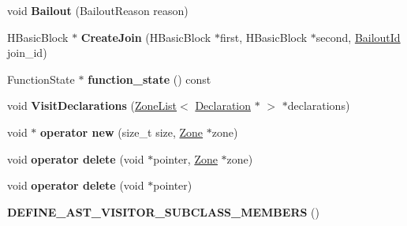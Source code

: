 \begin{DoxyCompactItemize}
\item 
\hypertarget{classv8_1_1internal_1_1_h_optimized_graph_builder_af98057ce6d5ac2667c0f01c7cab692ed}{}void {\bfseries Bailout} (Bailout\+Reason reason)\label{classv8_1_1internal_1_1_h_optimized_graph_builder_af98057ce6d5ac2667c0f01c7cab692ed}

\item 
\hypertarget{classv8_1_1internal_1_1_h_optimized_graph_builder_a2116016b8dca57b3ae2fe6c69f822e85}{}H\+Basic\+Block $\ast$ {\bfseries Create\+Join} (H\+Basic\+Block $\ast$first, H\+Basic\+Block $\ast$second, \hyperlink{classv8_1_1internal_1_1_bailout_id}{Bailout\+Id} join\+\_\+id)\label{classv8_1_1internal_1_1_h_optimized_graph_builder_a2116016b8dca57b3ae2fe6c69f822e85}

\item 
\hypertarget{classv8_1_1internal_1_1_h_optimized_graph_builder_a7d9d56cc7e3d52edcd21871ca352592d}{}Function\+State $\ast$ {\bfseries function\+\_\+state} () const \label{classv8_1_1internal_1_1_h_optimized_graph_builder_a7d9d56cc7e3d52edcd21871ca352592d}

\item 
\hypertarget{classv8_1_1internal_1_1_h_optimized_graph_builder_a748bb747bc0cfa1d6512ee72cb337cfd}{}void {\bfseries Visit\+Declarations} (\hyperlink{classv8_1_1internal_1_1_zone_list}{Zone\+List}$<$ \hyperlink{classv8_1_1internal_1_1_declaration}{Declaration} $\ast$ $>$ $\ast$declarations)\label{classv8_1_1internal_1_1_h_optimized_graph_builder_a748bb747bc0cfa1d6512ee72cb337cfd}

\item 
\hypertarget{classv8_1_1internal_1_1_h_optimized_graph_builder_ab355eb3eac87f188f0f80bbd04d0bf0c}{}void $\ast$ {\bfseries operator new} (size\+\_\+t size, \hyperlink{classv8_1_1internal_1_1_zone}{Zone} $\ast$zone)\label{classv8_1_1internal_1_1_h_optimized_graph_builder_ab355eb3eac87f188f0f80bbd04d0bf0c}

\item 
\hypertarget{classv8_1_1internal_1_1_h_optimized_graph_builder_a7f726be397501d3f87ecf26a0f6d5edc}{}void {\bfseries operator delete} (void $\ast$pointer, \hyperlink{classv8_1_1internal_1_1_zone}{Zone} $\ast$zone)\label{classv8_1_1internal_1_1_h_optimized_graph_builder_a7f726be397501d3f87ecf26a0f6d5edc}

\item 
\hypertarget{classv8_1_1internal_1_1_h_optimized_graph_builder_a852e01517e9d8f200e799ce900b9bd14}{}void {\bfseries operator delete} (void $\ast$pointer)\label{classv8_1_1internal_1_1_h_optimized_graph_builder_a852e01517e9d8f200e799ce900b9bd14}

\item 
\hypertarget{classv8_1_1internal_1_1_h_optimized_graph_builder_ae7491f10a834982c6c4e2838c22af37b}{}{\bfseries D\+E\+F\+I\+N\+E\+\_\+\+A\+S\+T\+\_\+\+V\+I\+S\+I\+T\+O\+R\+\_\+\+S\+U\+B\+C\+L\+A\+S\+S\+\_\+\+M\+E\+M\+B\+E\+R\+S} ()\label{classv8_1_1internal_1_1_h_optimized_graph_builder_ae7491f10a834982c6c4e2838c22af37b}

\end{DoxyCompactItemize}
